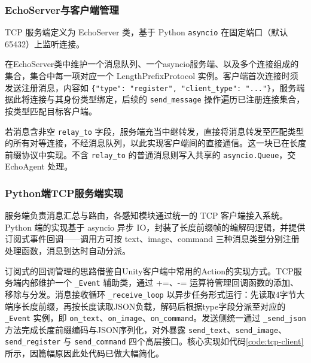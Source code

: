 \documentclass[bachelor]{njupthesis}
\begin{document}
\subsubsection{EchoServer与客户端管理}

TCP 服务端定义为 EchoServer 类，基于 Python \texttt{asyncio} 在固定端口（默认 65432）上监听连接。

在EchoServer类中维护一个消息队列、一个asyncio服务端、以及多个连接组成的集合，集合中每一项对应一个 LengthPrefixProtocol 实例。客户端首次连接时须发送注册消息，内容如 \texttt{\{"type": "register", "client\_type": "..."\}}，服务端据此将连接与其身份类型绑定，后续的 \texttt{send\_message} 操作遍历已注册连接集合，按类型匹配目标客户端。

若消息含非空 \texttt{relay\_to} 字段，服务端充当中继转发，直接将消息转发至匹配类型的所有对等连接，不经消息队列，以此实现客户端间的直接通信。这一块已在长度前缀协议中实现。不含 \texttt{relay\_to} 的普通消息则写入共享的 \texttt{asyncio.Queue}，交 EchoAgent 处理。

\subsubsection{Python端TCP服务端实现}

服务端负责消息汇总与路由，各感知模块通过统一的 TCP 客户端接入系统。Python 端的实现基于 asyncio 异步 IO，封装了长度前缀帧的编解码逻辑，并提供订阅式事件回调——调用方可按 text、image、command 三种消息类型分别注册处理函数，消息到达时自动分派。

订阅式的回调管理的思路借鉴自Unity客户端中常用的Action的实现方式。TCP服务端内部维护一个 \texttt{\_Event} 辅助类，通过 +=、-= 运算符管理回调函数的添加、移除与分发。消息接收循环 \texttt{\_receive\_loop} 以异步任务形式运行：先读取4字节大端序长度前缀，再按长度读取JSON负载，解码后根据type字段分派至对应的 \texttt{\_Event} 实例，即 \texttt{on\_text}、\texttt{on\_image}、\texttt{on\_command}。发送侧统一通过 \texttt{\_send\_json} 方法完成长度前缀编码与JSON序列化，对外暴露 \texttt{send\_text}、\texttt{send\_image}、\texttt{send\_register} 与 \texttt{send\_command} 四个高层接口。核心实现如代码\ref{code:tcp-client}所示，因篇幅原因此处代码已做大幅简化。
\end{document}
